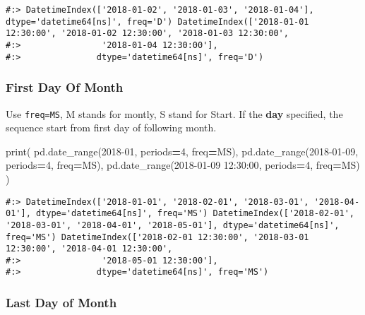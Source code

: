 \documentclass[
]{book}
\newenvironment{Shaded}{\begin{snugshade}}{\end{snugshade}}
\newcommand{\BuiltInTok}[1]{#1}
\newcommand{\DecValTok}[1]{\textcolor[rgb]{0.06,0.06,0.06}{#1}}
\newcommand{\NormalTok}[1]{#1}
\newcommand{\OperatorTok}[1]{\textcolor[rgb]{0.43,0.43,0.43}{\textbf{#1}}}
\newcommand{\StringTok}[1]{\textcolor[rgb]{0.5,0.5,0.5}{#1}}
\begin{document}
\begin{verbatim}
#:> DatetimeIndex(['2018-01-02', '2018-01-03', '2018-01-04'], dtype='datetime64[ns]', freq='D') DatetimeIndex(['2018-01-01 12:30:00', '2018-01-02 12:30:00', '2018-01-03 12:30:00',
#:>                '2018-01-04 12:30:00'],
#:>               dtype='datetime64[ns]', freq='D')
\end{verbatim}

\hypertarget{first-day-of-month}{%
\subsubsection{First Day Of Month}\label{first-day-of-month}}

Use \texttt{freq=MS}, M stands for montly, S stand for Start. If the \textbf{day} specified, the sequence start from first day of following month.

\begin{Shaded}
\begin{Highlighting}[]
\BuiltInTok{print}\NormalTok{(}
\NormalTok{  pd.date\_range(}\StringTok{\textquotesingle{}2018{-}01\textquotesingle{}}\NormalTok{, periods}\OperatorTok{=}\DecValTok{4}\NormalTok{, freq}\OperatorTok{=}\StringTok{\textquotesingle{}MS\textquotesingle{}}\NormalTok{),}
\NormalTok{  pd.date\_range(}\StringTok{\textquotesingle{}2018{-}01{-}09\textquotesingle{}}\NormalTok{, periods}\OperatorTok{=}\DecValTok{4}\NormalTok{, freq}\OperatorTok{=}\StringTok{\textquotesingle{}MS\textquotesingle{}}\NormalTok{),}
\NormalTok{  pd.date\_range(}\StringTok{\textquotesingle{}2018{-}01{-}09 12:30:00\textquotesingle{}}\NormalTok{, periods}\OperatorTok{=}\DecValTok{4}\NormalTok{, freq}\OperatorTok{=}\StringTok{\textquotesingle{}MS\textquotesingle{}}\NormalTok{) )}
\end{Highlighting}
\end{Shaded}

\begin{verbatim}
#:> DatetimeIndex(['2018-01-01', '2018-02-01', '2018-03-01', '2018-04-01'], dtype='datetime64[ns]', freq='MS') DatetimeIndex(['2018-02-01', '2018-03-01', '2018-04-01', '2018-05-01'], dtype='datetime64[ns]', freq='MS') DatetimeIndex(['2018-02-01 12:30:00', '2018-03-01 12:30:00', '2018-04-01 12:30:00',
#:>                '2018-05-01 12:30:00'],
#:>               dtype='datetime64[ns]', freq='MS')
\end{verbatim}

\hypertarget{last-day-of-month}{%
\subsubsection{Last Day of Month}\label{last-day-of-month}}
\end{document}
